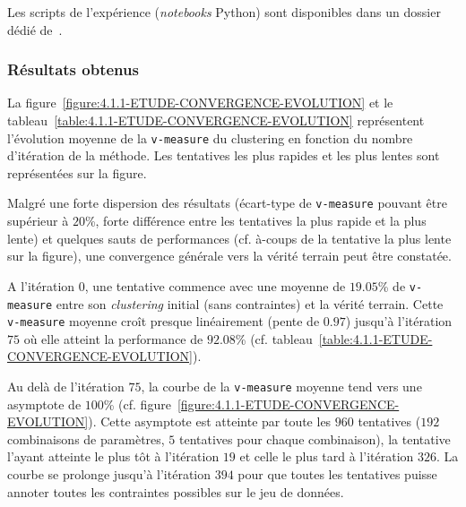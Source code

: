 			\begin{leftBarInformation}
				Les scripts de l'expérience (\textit{notebooks} Python) sont disponibles dans un dossier dédié de~\cite{schild:cognitivefactory-interactive-clustering-comparative-study:2021}.
			\end{leftBarInformation}

		\subsubsection{Résultats obtenus}
			
			La figure~\ref{figure:4.1.1-ETUDE-CONVERGENCE-EVOLUTION} et le tableau~\ref{table:4.1.1-ETUDE-CONVERGENCE-EVOLUTION} représentent l'évolution moyenne de la \texttt{v-measure} du clustering en fonction du nombre d'itération de la méthode. Les tentatives les plus rapides et les plus lentes sont représentées sur la figure.
							
			Malgré une forte dispersion des résultats (écart-type de \texttt{v-measure} pouvant être supérieur à $20$\%, forte différence entre les tentatives la plus rapide et la plus lente) et quelques sauts de performances (cf. à-coups de la tentative la plus lente sur la figure), une convergence générale vers la vérité terrain peut être constatée.
			
			A l'itération $0$, une tentative commence avec une moyenne de $19.05$\% de \texttt{v-measure}  entre son \textit{clustering} initial (sans contraintes) et la vérité terrain.
			Cette \texttt{v-measure} moyenne croît presque linéairement (pente de $0.97$) jusqu'à l'itération $75$ où elle atteint la performance de $92.08$\% (cf. tableau~\ref{table:4.1.1-ETUDE-CONVERGENCE-EVOLUTION}).

			Au delà de l'itération $75$, la courbe de la \texttt{v-measure} moyenne tend vers une asymptote de $100$\% (cf. figure~\ref{figure:4.1.1-ETUDE-CONVERGENCE-EVOLUTION}).
			Cette asymptote est atteinte par toute les $960$ tentatives ($192$ combinaisons de paramètres, $5$ tentatives pour chaque combinaison), la tentative l'ayant atteinte le plus tôt à l'itération $19$ et celle le plus tard à l'itération $326$.
			La courbe se prolonge jusqu'à l'itération $394$ pour que toutes les tentatives puisse annoter toutes les contraintes possibles sur le jeu de données.
			
